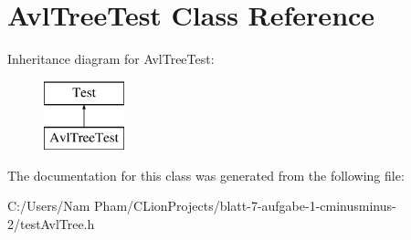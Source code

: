 \hypertarget{class_avl_tree_test}{}\section{Avl\+Tree\+Test Class Reference}
\label{class_avl_tree_test}
Inheritance diagram for Avl\+Tree\+Test\+:\begin{figure}[H]
\begin{center}
\leavevmode
\includegraphics[height=2.000000cm]{class_avl_tree_test}
\end{center}
\end{figure}


The documentation for this class was generated from the following file\+:\begin{DoxyCompactItemize}
\item 
C\+:/\+Users/\+Nam Pham/\+C\+Lion\+Projects/blatt-\/7-\/aufgabe-\/1-\/cminusminus-\/2/test\+Avl\+Tree.\+h\end{DoxyCompactItemize}
